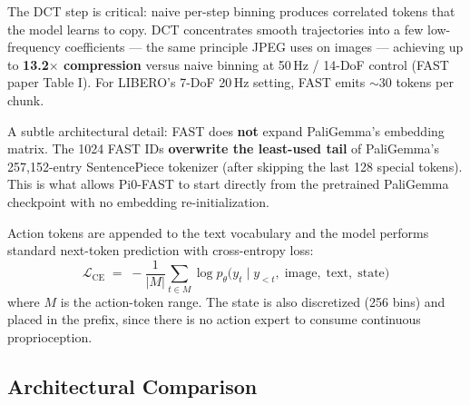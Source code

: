 \documentclass[11pt,letterpaper]{article}
\begin{document}
The DCT step is critical: naive per-step binning produces correlated tokens that the model learns to copy. DCT concentrates smooth trajectories into a few low-frequency coefficients --- the same principle JPEG uses on images --- achieving up to \textbf{13.2$\times$ compression} versus naive binning at 50\,Hz / 14-DoF control (FAST paper Table I). For LIBERO's 7-DoF 20\,Hz setting, FAST emits $\sim$30 tokens per chunk.

A subtle architectural detail: FAST does \textbf{not} expand PaliGemma's embedding matrix. The 1024 FAST IDs \textbf{overwrite the least-used tail} of PaliGemma's 257{,}152-entry SentencePiece tokenizer (after skipping the last 128 special tokens). This is what allows Pi0-FAST to start directly from the pretrained PaliGemma checkpoint with no embedding re-initialization.

Action tokens are appended to the text vocabulary and the model performs standard next-token prediction with cross-entropy loss:
\begin{equation}
  \mathcal{L}_{\text{CE}} \;=\; -\frac{1}{|M|}\sum_{t \in M} \log p_\theta\!\bigl(y_t \mid y_{<t},\; \text{image},\; \text{text},\; \text{state}\bigr)
  \label{eq:ce-loss}
\end{equation}
where $M$ is the action-token range. The state is also discretized (256 bins) and placed in the prefix, since there is no action expert to consume continuous proprioception.

\subsection{Architectural Comparison}
\end{document}
